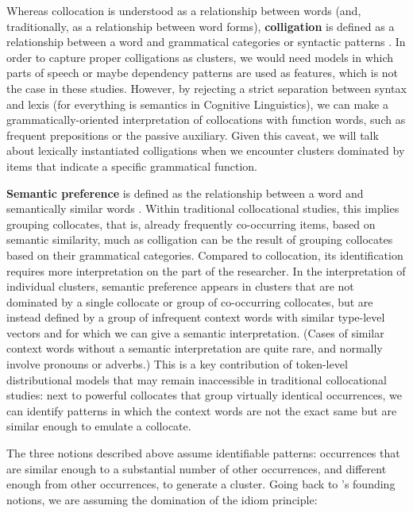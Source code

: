 \documentclass[
]{book}
\begin{document}
Whereas collocation is understood as a relationship between words (and, traditionally, as a relationship between word forms), \textbf{colligation} is defined as a relationship between a word and grammatical categories or syntactic patterns \autocites[14]{firth_1957a}[15]{sinclair_1998}[124]{stubbs_2009}. In order to capture proper colligations as clusters, we would need models in which parts of speech or maybe dependency patterns are used as features, which is not the case in these studies. However, by rejecting a strict separation between syntax and lexis
(for everything is semantics in Cognitive Linguistics),
we can make a grammatically-oriented interpretation of collocations with function words, such as frequent prepositions or the passive auxiliary. Given this caveat, we will talk about lexically instantiated colligations when we encounter clusters dominated by items that indicate a specific grammatical function.

\textbf{Semantic preference} is defined as the relationship between a word and semantically similar words \autocites[16]{sinclair_1998}[125]{stubbs_2009}[138-140]{mcenery.hardie_2012}. Within traditional collocational studies, this implies grouping collocates, that is, already frequently co-occurring items, based on semantic similarity, much as colligation can be the result of grouping collocates based on their grammatical categories. Compared to collocation, its identification requires more interpretation on the part of the researcher.
In the interpretation of individual clusters, semantic preference appears in clusters that are not dominated by a single collocate or group of co-occurring collocates, but are instead defined by a group of infrequent context words with similar type-level vectors and for which we can give a semantic interpretation. (Cases of similar context words without a semantic interpretation are quite rare, and normally involve pronouns or adverbs.) This is a key contribution of token-level distributional models that may remain inaccessible in traditional collocational studies: next to powerful collocates that group virtually identical occurrences, we can identify patterns in which the context words are not the exact same but are similar enough to emulate a collocate.

The three notions described above assume identifiable patterns: occurrences that are similar enough to a substantial number of other occurrences, and different enough from other occurrences, to generate a cluster. Going back to \textcite{sinclair_1991}'s founding notions, we are assuming the domination of the idiom principle:
\end{document}
